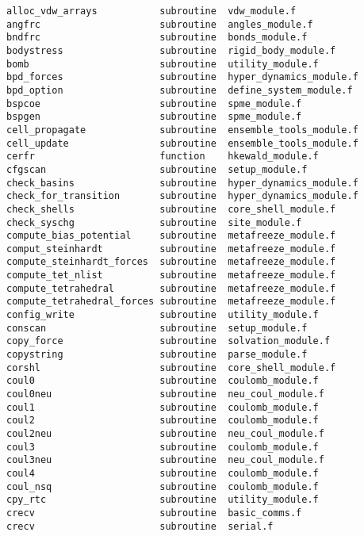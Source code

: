 \begin{verbatim}
alloc_vdw_arrays           subroutine  vdw_module.f              
angfrc                     subroutine  angles_module.f           
bndfrc                     subroutine  bonds_module.f            
bodystress                 subroutine  rigid_body_module.f       
bomb                       subroutine  utility_module.f          
bpd_forces                 subroutine  hyper_dynamics_module.f   
bpd_option                 subroutine  define_system_module.f    
bspcoe                     subroutine  spme_module.f             
bspgen                     subroutine  spme_module.f             
cell_propagate             subroutine  ensemble_tools_module.f   
cell_update                subroutine  ensemble_tools_module.f   
cerfr                      function    hkewald_module.f          
cfgscan                    subroutine  setup_module.f            
check_basins               subroutine  hyper_dynamics_module.f   
check_for_transition       subroutine  hyper_dynamics_module.f   
check_shells               subroutine  core_shell_module.f       
check_syschg               subroutine  site_module.f             
compute_bias_potential     subroutine  metafreeze_module.f       
comput_steinhardt          subroutine  metafreeze_module.f       
compute_steinhardt_forces  subroutine  metafreeze_module.f       
compute_tet_nlist          subroutine  metafreeze_module.f       
compute_tetrahedral        subroutine  metafreeze_module.f       
compute_tetrahedral_forces subroutine  metafreeze_module.f       
config_write               subroutine  utility_module.f          
conscan                    subroutine  setup_module.f            
copy_force                 subroutine  solvation_module.f        
copystring                 subroutine  parse_module.f            
corshl                     subroutine  core_shell_module.f       
coul0                      subroutine  coulomb_module.f          
coul0neu                   subroutine  neu_coul_module.f         
coul1                      subroutine  coulomb_module.f          
coul2                      subroutine  coulomb_module.f          
coul2neu                   subroutine  neu_coul_module.f         
coul3                      subroutine  coulomb_module.f          
coul3neu                   subroutine  neu_coul_module.f         
coul4                      subroutine  coulomb_module.f          
coul_nsq                   subroutine  coulomb_module.f          
cpy_rtc                    subroutine  utility_module.f          
crecv                      subroutine  basic_comms.f             
crecv                      subroutine  serial.f                  

\end{verbatim}
